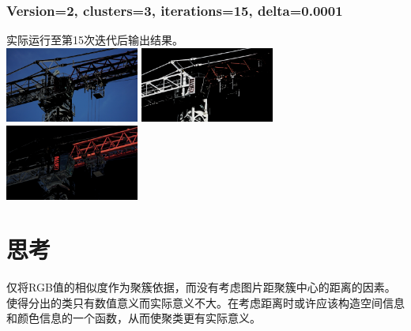 \documentclass{article}
\begin{document}
\subsubsection{Version=2, clusters=3, iterations=15, delta=0.0001}
实际运行至第15次迭代后输出结果。\\
\includegraphics[width=0.33\textwidth]{src/v2_i15d1e-4section1.png}
\includegraphics[width=0.33\textwidth]{src/v2_i15d1e-4section2.png}
\includegraphics[width=0.33\textwidth]{src/v2_i15d1e-4section3.png}\\
\section{思考}
仅将RGB值的相似度作为聚簇依据，而没有考虑图片距聚簇中心的距离的因素。使得分出的类只有数值意义而实际意义不大。在考虑距离时或许应该构造空间信息和颜色信息的一个函数，从而使聚类更有实际意义。
\end{document}

